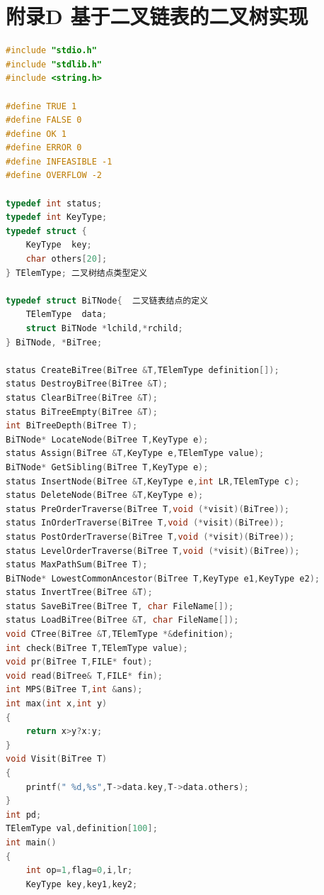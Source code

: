\documentclass[supercite]{Experimental_Report}
\theoremstyle{definition}
\begin{document}
\section{附录D 基于二叉链表的二叉树实现}
\begin{lstlisting}[language=C]
				#include "stdio.h"
#include "stdlib.h"
#include <string.h>

#define TRUE 1
#define FALSE 0
#define OK 1
#define ERROR 0
#define INFEASIBLE -1
#define OVERFLOW -2

typedef int status;
typedef int KeyType;
typedef struct {
	KeyType  key;
	char others[20];
} TElemType; 二叉树结点类型定义

typedef struct BiTNode{  二叉链表结点的定义
	TElemType  data;
	struct BiTNode *lchild,*rchild;
} BiTNode, *BiTree;

status CreateBiTree(BiTree &T,TElemType definition[]);
status DestroyBiTree(BiTree &T);
status ClearBiTree(BiTree &T);
status BiTreeEmpty(BiTree &T);
int BiTreeDepth(BiTree T);
BiTNode* LocateNode(BiTree T,KeyType e);
status Assign(BiTree &T,KeyType e,TElemType value);
BiTNode* GetSibling(BiTree T,KeyType e);
status InsertNode(BiTree &T,KeyType e,int LR,TElemType c);
status DeleteNode(BiTree &T,KeyType e);
status PreOrderTraverse(BiTree T,void (*visit)(BiTree));
status InOrderTraverse(BiTree T,void (*visit)(BiTree));
status PostOrderTraverse(BiTree T,void (*visit)(BiTree));
status LevelOrderTraverse(BiTree T,void (*visit)(BiTree));
status MaxPathSum(BiTree T);
BiTNode* LowestCommonAncestor(BiTree T,KeyType e1,KeyType e2);
status InvertTree(BiTree &T);
status SaveBiTree(BiTree T, char FileName[]);
status LoadBiTree(BiTree &T, char FileName[]);
void CTree(BiTree &T,TElemType *&definition);
int check(BiTree T,TElemType value);
void pr(BiTree T,FILE* fout);
void read(BiTree& T,FILE* fin);
int MPS(BiTree T,int &ans);
int max(int x,int y)
{
	return x>y?x:y;
}
void Visit(BiTree T)
{
	printf(" %d,%s",T->data.key,T->data.others);
}
int pd;
TElemType val,definition[100];
int main()
{
	int op=1,flag=0,i,lr;
	KeyType key,key1,key2;
	

\end{lstlisting}
\end{document}
